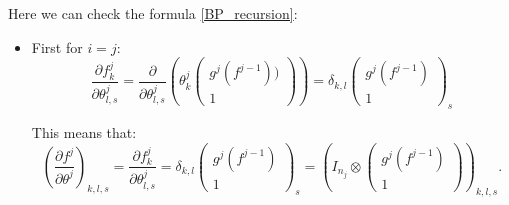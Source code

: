 Here we can check the formula \eqref{BP_recursion}:
\begin{itemize} 
	\item First for $i = j$:
	\begin{equation}
	\frac{\partial f^j_k}{\partial \theta^j_{l,s}} =
	\frac{\partial}{\partial \theta^j_{l,s}}
	\left( 
	\theta^j_{k}
	\begin{pmatrix}
	g^{j}(f^{j-1})) \\ 1 
	\end{pmatrix}
	\right) 
	= \delta_{k,l} 
	\begin{pmatrix} 
	g^{j}(f^{j-1}) \\ 1 
	\end{pmatrix}_{s}
	\end{equation}
	
	This means that:
	\begin{equation}
	\left(\frac{\partial {f^j}}{\partial {\theta^j}}\right)_{k,l,s} = \frac{\partial f^j_k}{\partial \theta^j_{l,s}} 
	= \delta_{k,l} \begin{pmatrix} g^{j}(f^{j-1}) \\ 1 \end{pmatrix}_{s} = (I_{n_j} \otimes \begin{pmatrix}
	g^{j}(f^{j-1}) \\
	1 
	\end{pmatrix})_{k,l,s}.
	\end{equation}
	

\end{itemize}
